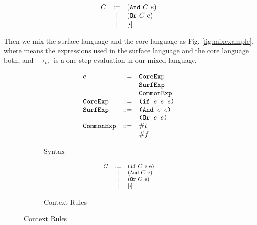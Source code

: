 \[
\begin{array}{lcl}
C &:=& (\m{And}~C~e)\\
&|& (\m{Or}~C~e)\\
&|&[\bigcdot]\\
\end{array}
\]

Then we mix the surface language and the core language as Fig. \ref{fig:mixexample}, where  means the expressions used in the surface language and the core language both, and $\to_m$ is a one-step evaluation in our mixed language.

\begin{figure}[thb]
\centering
\begin{subfigure}{\linewidth}{\footnotesize
    \begin{flushleft}
        \[
        \begin{array}{lll}
        e &::=& \mbox{\tt CoreExp} \\
        &|&\mbox{\tt SurfExp}\\
        &|&\mbox{\tt CommonExp}\\
        \mbox{\tt CoreExp} &::=& \texttt{(if~$e$~$e$~$e$)}\\
        \mbox{\tt SurfExp} &::=& \texttt{(And~$e$~$e$)}\\
        &|&\texttt{(Or~$e$~$e$)}\\
        \mbox{\tt CommonExp} &::=& \#t\\
        &|& \#f\\
        \end{array}
        \]
    \end{flushleft}
    \caption{Syntax}
    \label{fig:mixsyntax}
}
\end{subfigure}
\begin{subfigure}{\linewidth}{\footnotesize
    \begin{flushleft}
        \[\footnotesize
        \begin{array}{lcl}
        C &:=& (\m{if}~C~$e$~$e$)\\
        &|& (\m{And}~C~$e$)\\
        &|& (\m{Or}~C~$e$)\\
        &|&[\bigcdot]\\
        \end{array}
        \]
        \end{flushleft}
    \caption{Context Rules}
    \label{fig:mixcontext}
}
\end{subfigure}


\end{figure}
